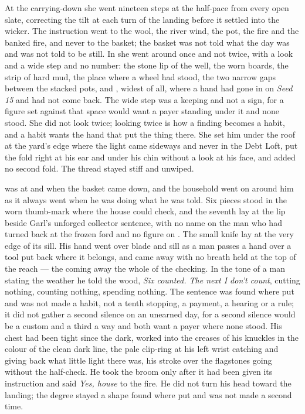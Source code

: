 At the carrying-down she went nineteen steps at the half-pace from every open slate, correcting the tilt at each turn of the landing before it settled into the wicker. The instruction went to the wool, the river wind, the pot, the fire and the banked fire, and never to the basket; the basket was not told what the day was and was not told to be still. In  she went around  once and not twice, with a look and a wide step and no number: the stone lip of the well, the worn boards, the strip of hard mud, the place where a wheel had stood, the two narrow gaps between the stacked pots, and , widest of all, where a hand had gone in on \emph{Seed 15} and had not come back. The wide step was a keeping and not a sign, for a figure set against that space would want a payer standing under it and none stood. She did not look twice; looking twice is how a finding becomes a habit, and a habit wants the hand that put the thing there. She set him under the roof at the yard's edge where the light came sideways and never in the Debt Loft, put the fold right at his ear and under his chin without a look at his face, and added no second fold. The thread stayed stiff and unwiped.

\scenebreak

 was at  and  when the basket came down, and the household went on around him as it always went when he was doing what he was told. Six pieces stood in the worn thumb-mark where the house could check, and the seventh lay at the lip beside Garl's unforged collector sentence, with no name on the man who had turned back at the frozen ford and no figure on . The small knife lay at the very edge of its sill. His hand went over blade and sill as a man passes a hand over a tool put back where it belongs, and came away with no breath held at the top of the reach --- the coming away the whole of the checking. In the tone of a man stating the weather he told the wood, \emph{Six counted. The next I don't count}, cutting nothing, counting nothing, spending nothing. The sentence was found where put and was not made a habit, not a tenth stopping, a payment, a hearing or a rule; it did not gather a second silence on an unearned day, for a second silence would be a custom and a third a way and both want a payer where none stood. His chest had been tight since the dark,  worked into the creases of his knuckles in the colour of the clean dark line, the pale clip-ring at his left wrist catching and giving back what little light there was, his stroke over the flagstones going without the half-check. He took the broom only after it had been given its instruction and said \emph{Yes, house} to the fire. He did not turn his head toward the landing; the degree stayed a shape found where put and was not made a second time.

